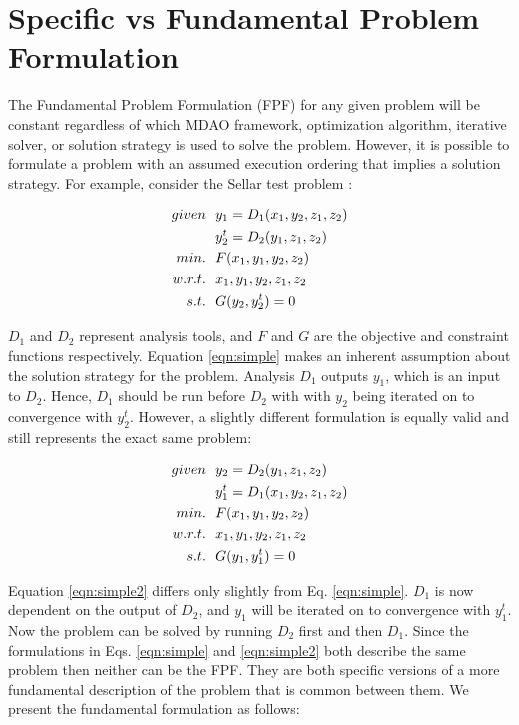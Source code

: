 \section{Specific vs Fundamental Problem Formulation }
	\label{s:specific vs fundamental}
    The Fundamental Problem Formulation (FPF) for any given problem will be constant regardless 
    of which MDAO framework, optimization algorithm, iterative solver, or solution strategy
    is used to solve the problem. However, it is possible to formulate a problem
    with an assumed execution ordering that implies a solution strategy. 
    For example, consider the Sellar test problem \cite{AIAA:sellar}: 

    \begin{align}
        given & \ \ y_1 = D_1(x_1,y_2,z_1,z_2) \notag
        \\      & \ \ y_2^t = D_2(y_1,z_1,z_2) \notag
        \\min. &\ \ F(x_1,y_1,y_2,z_2) \notag
        \\w.r.t. & \ \ x_1,y_1,y_2,z_1,z_2 \notag
        \\s.t. & \ \ G(y_2,y_2^t) = 0
        \label{eqn:simple}
    \end{align}

    $D_1$ and $D_2$ represent analysis tools, and $F$ and $G$ are the objective 
    and constraint functions respectively. Equation \ref{eqn:simple} makes an 
    inherent assumption about the solution strategy for the problem. Analysis 
    $D_1$ outputs $y_1$, which is an input to $D_2$. Hence, $D_1$ should be run 
    before $D_2$ with with $y_2$ being iterated on to convergence with $y_2^t$. 
    However, a slightly different formulation is equally valid and still 
    represents the exact same problem: 

    \begin{align}
        given & \ \ y_2 = D_2(y_1,z_1,z_2) \notag
        \\      & \ \ y_1^t = D_1(x_1,y_2,z_1,z_2) \notag
        \\min. &\ \ F(x_1,y_1,y_2,z_2) \notag
        \\w.r.t. & \ \ x_1,y_1,y_2,z_1,z_2 \notag
        \\s.t. & \ \ G(y_1,y_1^t) = 0
        \label{eqn:simple2}
    \end{align}

    Equation \ref{eqn:simple2} differs only slightly from Eq. \ref{eqn:simple}. 
    $D_1$ is now dependent on the output of $D_2$, and $y_1$ will be iterated on to 
    convergence with $y_1^t$. Now the problem can be solved by running $D_2$ first 
    and then $D_1$. Since the formulations in Eqs. \ref{eqn:simple} and 
    \ref{eqn:simple2} both describe the same problem then neither can be the
    FPF. They are both specific versions of a more fundamental description of 
    the problem that is common between them. We present the fundamental 
    formulation as follows: 

